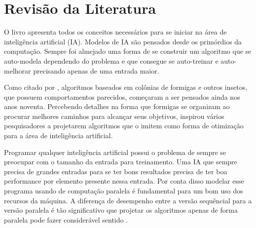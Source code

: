 \section{Revisão da Literatura}

O livro \cite{BookIA} apresenta todos os conceitos necessários para se iniciar na área de inteligência artificial (IA).
Modelos de IA são pensados desde os primórdios da computação. Sempre foi almejado uma forma de se construir um algoritmo
que se auto-modela dependendo do problema e que consegue se auto-treinar e auto-melhorar precisando apenas de uma entrada
maior.

Como citado por \citeauthor{AntColonyOptimization} \cite{AntColonyOptimization}, algoritmos baseados em colônias de formigas
e outros insetos, que possuem comportamentos parecidos, começaram a ser pensados ainda nos anos noventa. 
Percebendo detalhes na forma que formigas se organizam ao procurar melhores
caminhos para alcançar seus objetivos, inspirou vários pesquisadores a projetarem algoritmos que o imitem como forma
de otimização para a área de inteligência artificial.

Programar qualquer inteligência artificial possui o problema de sempre se preocupar com o tamanho da entrada para treinamento.
Uma IA que sempre precisa de grandes entradas para se ter bons resultados precisa de ter boa performance por elemento presente nessa entrada. 
Por conta disso modelar esse programa usando de
computação paralela é fundamental para um bom uso dos recursos da máquina. A diferença de desempenho entre a versão sequêncial
para a versão paralela é tão significativo que projetar os algoritmos apenas de forma paralela pode fazer considerável sentido
\cite{SequentialVSParallel}.